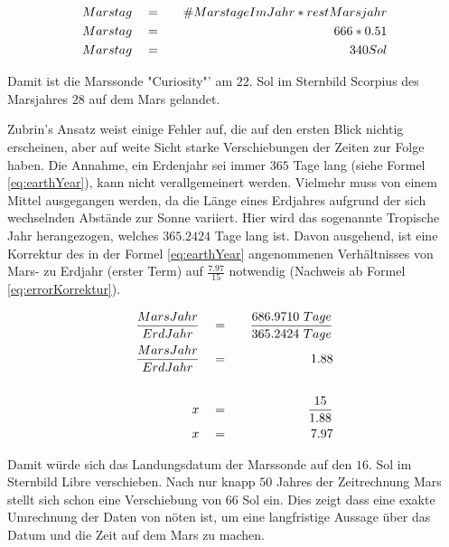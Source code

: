 \begin{eqnarray}
	Marstag \quad & = & \quad \#MarstageImJahr * restMarsjahr \\
	Marstag \quad & = & \quad 666 * 0.51 \notag\\
	Marstag \quad & = & \quad 340 Sol \notag
	\label{eq:MarsMonthSol}
\end{eqnarray}

Damit ist die Marssonde "Curiosity"' am $22.$ Sol im Sternbild Scorpius des 
Marsjahres $28$ auf dem Mars gelandet.

Zubrin's Ansatz weist einige Fehler auf, die auf den ersten Blick nichtig
erscheinen, aber auf weite Sicht starke Verschiebungen der Zeiten zur Folge
haben. Die Annahme, ein Erdenjahr sei immer $365$ Tage lang (siehe Formel
\ref{eq:earthYear}), kann nicht verallgemeinert werden. Vielmehr muss von einem
Mittel ausgegangen werden, da die L{\"a}nge eines Erdjahres aufgrund der sich
wechselnden Abst{\"a}nde zur Sonne variiert. Hier wird das sogenannte Tropische Jahr
herangezogen, welches $365.2424$ Tage lang ist. Davon ausgehend, ist eine
Korrektur des in der Formel \ref{eq:earthYear} angenommenen Verh{\"a}ltnisses von
Mars- zu Erdjahr (erster Term) auf $\frac{7.97}{15}$ notwendig (Nachweis ab
Formel \ref{eq:errorKorrektur}).

\begin{eqnarray}
	\frac{MarsJahr}{ErdJahr} \quad & = & \quad \frac{686.9710 \ Tage}{365.2424 \ Tage}
	\\
	\label{eq:errorKorrektur}  
	\frac{MarsJahr}{ErdJahr} \quad & = & \quad 1.88 \notag\\
	\notag\\
	x \quad & = & \quad \frac{15}{1.88} \notag\\
	x \quad & = & \quad 7.97 \notag
\end{eqnarray}

Damit w{\"u}rde sich das Landungsdatum der Marssonde auf den $16.$ Sol im Sternbild
Libre verschieben. Nach nur knapp $50$ Jahres der Zeitrechnung Mars stellt sich
schon eine Verschiebung von $66$ Sol ein. Dies zeigt dass eine exakte Umrechnung
der Daten von n{\"o}ten ist, um eine langfristige Aussage {\"u}ber das Datum und die
Zeit auf dem Mars zu machen.